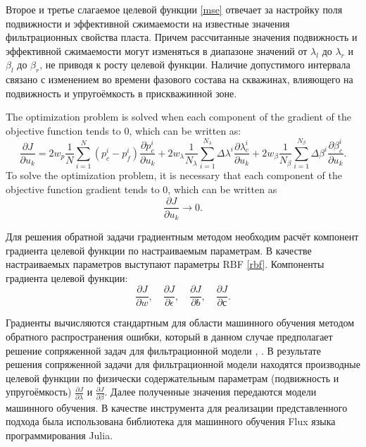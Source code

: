 \documentclass{article}
\begin{document}
Второе и третье слагаемое целевой функции {\ref{mse}} отвечает за настройку поля подвижности и эффективной сжимаемости  на известные значения фильтрационных свойства пласта. Причем рассчитанные значения подвижность и эффективной сжимаемости могут изменяться в диапазоне значений от $\lambda_l$ до $\lambda_r$ и $\beta_l$ до $\beta_r$, не приводя к росту целевой функции. Наличие допустимого интервала связано с изменением во времени фазового состава на скважинах, влияющего на подвижность и упругоёмкость в прискважинной зоне. 


The optimization problem is solved when each component of the gradient of the objective function tends to 0, which can be written as:
\begin{equation}\label{grad}
	\frac{\partial J}{\partial u_k} = 
	2w_p\frac{1}{N}\sum_{i=1}^N	({p_c^i-p_f^i}) \frac{\partial p_c^i}{\partial u_k}+
	2w_{\lambda}\frac{1}{N_\lambda}\sum_{i=1}^{N_\lambda}{\Delta\lambda^i}\frac{\partial
		\lambda_{c}^i}{\partial u_k}+
	2w_{\beta}\frac{1}{N_\beta}\sum_{i=1}^{N_\beta}{\Delta\beta^i}\frac{\partial
			\beta_{c}^i}{\partial u_k}.
\end{equation}
To solve the optimization problem, it is necessary that each
component  of the objective function gradient tends to 0, which can
be written as
\begin{equation} \label{rp}
	\frac{\partial J}{\partial u_k} \rightarrow 0.
\end{equation}

Для решения обратной задачи градиентным методом необходим расчёт компонент градиента целевой функции по настраиваемым параметрам. В качестве настраиваемых параметров выступают параметры RBF \ref{rbf}. Компоненты градиента целевой функции:
\begin{equation*}
		\frac{\partial J}{\partial w},\quad \frac{\partial J}{\partial \epsilon},\quad \frac{\partial J}{\partial b}, \quad \frac{\partial J}{\partial с}.
\end{equation*}
	
Градиенты вычисляются стандартным для области машинного обучения методом обратного распространения ошибки, который в данном случае предполагает решение сопряженной задач для фильтрационной модели \cite{far}, \cite{kos3}. 
В результате решения сопряженной задачи для фильтрационной модели находятся производные целевой функции по физически содержательным параметрам (подвижность и упругоёмкость) $\frac{\partial J}{\partial \lambda}$ и $\frac{\partial J}{\partial \beta}$. Далее полученные значения передаются модели машинного обучения. В качестве инструмента для реализации представленного подхода была использована библиотека для машинного обучения Flux \cite{inn} языка программирования Julia.
\end{document}
